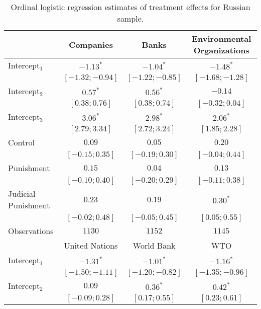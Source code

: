 \begin{table}[h]
\begin{center}
\caption{Ordinal logistic regression estimates of treatment effects for Russian sample.}
\begin{threeparttable}
\begin{tabular}{l c c c}
\hline
 & Companies & Banks & Environmental
Organizations \\
\hline
Intercept$_1$       & $-1.13^{*}$       & $-1.04^{*}$       & $-1.48^{*}$       \\
                    & $ [-1.32; -0.94]$ & $ [-1.22; -0.85]$ & $ [-1.68; -1.28]$ \\
Intercept$_2$       & $0.57^{*}$        & $0.56^{*}$        & $-0.14$           \\
                    & $ [ 0.38;  0.76]$ & $ [ 0.38;  0.74]$ & $ [-0.32;  0.04]$ \\
Intercept$_3$       & $3.06^{*}$        & $2.98^{*}$        & $2.06^{*}$        \\
                    & $ [ 2.79;  3.34]$ & $ [ 2.72;  3.24]$ & $ [ 1.85;  2.28]$ \\
Control             & $0.09$            & $0.05$            & $0.20$            \\
                    & $ [-0.15;  0.35]$ & $ [-0.19;  0.30]$ & $ [-0.04;  0.44]$ \\
Punishment          & $0.15$            & $0.04$            & $0.13$            \\
                    & $ [-0.10;  0.40]$ & $ [-0.20;  0.29]$ & $ [-0.11;  0.38]$ \\
Judicial Punishment & $0.23$            & $0.19$            & $0.30^{*}$        \\
                    & $ [-0.02;  0.48]$ & $ [-0.05;  0.45]$ & $ [ 0.05;  0.55]$ \\
\hline
Observations        & $1130$            & $1152$            & $1145$            \\
\hline
 & United Nations & World Bank & WTO \\
\hline
Intercept$_1$       & $-1.31^{*}$       & $-1.01^{*}$       & $-1.16^{*}$       \\
                    & $ [-1.50; -1.11]$ & $ [-1.20; -0.82]$ & $ [-1.35; -0.96]$ \\
Intercept$_2$       & $0.09$            & $0.36^{*}$        & $0.42^{*}$        \\
                    & $ [-0.09;  0.28]$ & $ [ 0.17;  0.55]$ & $ [ 0.23;  0.61]$ \\

\end{tabular}
\end{threeparttable}
\end{center}
\end{table}
